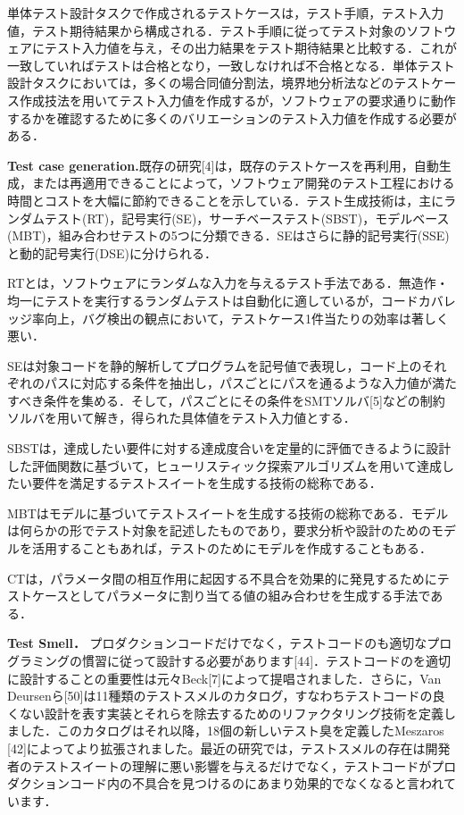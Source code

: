 \documentclass[conference]{IEEEtran}
\begin{document}
単体テスト設計タスクで作成されるテストケースは，テスト手順，テスト入力値，テスト期待結果から構成される．テスト手順に従ってテスト対象のソフトウェアにテスト入力値を与え，その出力結果をテスト期待結果と比較する．これが一致していればテストは合格となり，一致しなければ不合格となる．単体テスト設計タスクにおいては，多くの場合同値分割法，境界地分析法などのテストケース作成技法を用いてテスト入力値を作成するが，ソフトウェアの要求通りに動作するかを確認するために多くのバリエーションのテスト入力値を作成する必要がある．

\textbf{Test case generation.}既存の研究[4]は，既存のテストケースを再利用，自動生成，または再適用できることによって，ソフトウェア開発のテスト工程における時間とコストを大幅に節約できることを示している．テスト生成技術は，主にランダムテスト(RT)，記号実行(SE)，サーチベーステスト(SBST)，モデルベース(MBT)，組み合わせテストの5つに分類できる．SEはさらに静的記号実行(SSE)と動的記号実行(DSE)に分けられる．

RTとは，ソフトウェアにランダムな入力を与えるテスト手法である．無造作・均一にテストを実行するランダムテストは自動化に適しているが，コードカバレッジ率向上，バグ検出の観点において，テストケース1件当たりの効率は著しく悪い．

SEは対象コードを静的解析してプログラムを記号値で表現し，コード上のそれぞれのパスに対応する条件を抽出し，パスごとにパスを通るような入力値が満たすべき条件を集める．そして，パスごとにその条件をSMTソルバ[5]などの制約ソルバを用いて解き，得られた具体値をテスト入力値とする．

SBSTは，達成したい要件に対する達成度合いを定量的に評価できるように設計した評価関数に基づいて，ヒューリスティック探索アルゴリズムを用いて達成したい要件を満足するテストスイートを生成する技術の総称である．

MBTはモデルに基づいてテストスイートを生成する技術の総称である．モデルは何らかの形でテスト対象を記述したものであり，要求分析や設計のためのモデルを活用することもあれば，テストのためにモデルを作成することもある．

CTは，パラメータ間の相互作用に起因する不具合を効果的に発見するためにテストケースとしてパラメータに割り当てる値の組み合わせを生成する手法である．


\textbf{Test Smell．}
プロダクションコードだけでなく，テストコードのも適切なプログラミングの慣習に従って設計する必要があります[44]．テストコードのを適切に設計することの重要性は元々Beck[7]によって提唱されました．さらに，Van Deursenら[50]は11種類のテストスメルのカタログ，すなわちテストコードの良くない設計を表す実装とそれらを除去するためのリファクタリング技術を定義しました．このカタログはそれ以降，18個の新しいテスト臭を定義したMeszaros [42]によってより拡張されました。最近の研究では，テストスメルの存在は開発者のテストスイートの理解に悪い影響を与えるだけでなく，テストコードがプロダクションコード内の不具合を見つけるのにあまり効果的でなくなると言われています．
\end{document}
